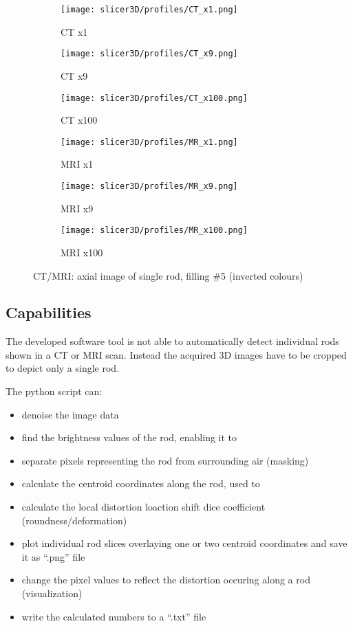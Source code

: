 \begin{figure}[!thb]
  \begin{subfigure}[b]{0.32\textwidth}
    \texttt{[image: slicer3D/profiles/CT\_x1.png]}
    \caption{CT x1}
    \label{fig:CT_x1}
  \end{subfigure}
  \hfill
  \begin{subfigure}[b]{0.32\textwidth}
    \texttt{[image: slicer3D/profiles/CT\_x9.png]}
    \caption{CT x9}
    \label{fig:CT_x9}
  \end{subfigure}
    \hfill
  \begin{subfigure}[b]{0.32\textwidth}
    \texttt{[image: slicer3D/profiles/CT\_x100.png]}
    \caption{CT x100}
    \label{fig:CT_x100}
  \end{subfigure}
  \begin{subfigure}[b]{0.32\textwidth}
    \texttt{[image: slicer3D/profiles/MR\_x1.png]}
    \caption{MRI x1}
    \label{fig:MRI_x1}
  \end{subfigure}
  \hfill
  \begin{subfigure}[b]{0.32\textwidth}
    \texttt{[image: slicer3D/profiles/MR\_x9.png]}
    \caption{MRI x9}
    \label{fig:MRI_x9}
  \end{subfigure}
    \hfill
  \begin{subfigure}[b]{0.32\textwidth}
    \texttt{[image: slicer3D/profiles/MR\_x100.png]}
    \caption{MRI x100}
    \label{fig:MRI_x100}
  \end{subfigure}
  \caption{CT/MRI: axial image of single rod, filling \#5  (inverted colours)}
  \label{fig:resample}
\end{figure}
\clearpage



\subsection{Capabilities}

The developed software tool is not able to automatically detect individual rods shown in a CT or MRI scan.
Instead the acquired 3D images have to be cropped to depict only a single rod.

The python script can:
\begin{itemize}
 \item denoise the image data
 \item find the brightness values of the rod, enabling it to
 \item separate pixels representing the rod from surrounding air (masking)
 \item calculate the centroid coordinates along the rod, used to
 \item calculate the local distortion
  \subitem loaction shift
  \subitem dice coefficient (roundness/deformation)
 \item plot individual rod slices
  \subitem overlaying one or two centroid coordinates
  \subitem and save it as ``.png'' file
 \item change the pixel values to reflect the distortion occuring along a rod (visualization)
 \item write the calculated numbers to a ``.txt'' file
\end{itemize}

